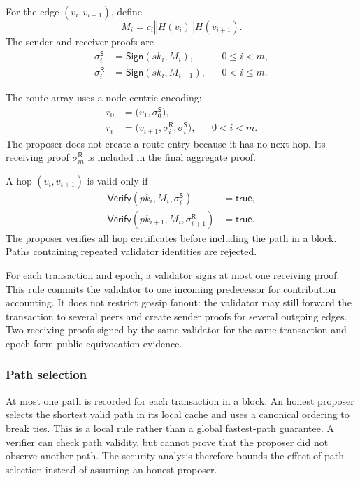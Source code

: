 \documentclass[lettersize,journal]{IEEEtran}
\begin{document}
For the edge $(v_i,v_{i+1})$, define
\begin{equation}
\label{eq:edge_statement}
M_i =
c_i\mathbin\Vert H(v_i)\mathbin\Vert H(v_{i+1}).
\end{equation}
The sender and receiver proofs are
\begin{equation}
\label{eq:path_proofs}
\begin{aligned}
\sigma_i^{\mathsf{S}}
&=
\mathsf{Sign}(sk_i,M_i),
&& 0\leq i<m,\\
\sigma_i^{\mathsf{R}}
&=
\mathsf{Sign}(sk_i,M_{i-1}),
&& 0<i\leq m.
\end{aligned}
\end{equation}

The route array uses a node-centric encoding:
\begin{equation}
\label{eq:route_entries}
\begin{aligned}
r_0
&=
\bigl(v_1,\sigma_0^{\mathsf{S}}\bigr),\\
r_i
&=
\bigl(v_{i+1},\sigma_i^{\mathsf{R}},
      \sigma_i^{\mathsf{S}}\bigr),
&& 0<i<m.
\end{aligned}
\end{equation}
The proposer does not create a route entry because it has no next hop.
Its receiving proof $\sigma_m^{\mathsf{R}}$ is included in the final aggregate proof.

A hop $(v_i,v_{i+1})$ is valid only if
\begin{align}
\mathsf{Verify}\!\left(
pk_i,M_i,\sigma_i^{\mathsf{S}}
\right)
&=\mathsf{true}, \\
\mathsf{Verify}\!\left(
pk_{i+1},M_i,\sigma_{i+1}^{\mathsf{R}}
\right)
&=\mathsf{true}.
\end{align}
The proposer verifies all hop certificates before including the path in a block.
Paths containing repeated validator identities are rejected.

For each transaction and epoch, a validator signs at most one receiving proof.
This rule commits the validator to one incoming predecessor for contribution accounting.
It does not restrict gossip fanout: the validator may still forward the transaction to several peers and create sender proofs for several outgoing edges.
Two receiving proofs signed by the same validator for the same transaction and epoch form public equivocation evidence.

\subsubsection{Path selection}
At most one path is recorded for each transaction in a block.
An honest proposer selects the shortest valid path in its local cache and uses a canonical ordering to break ties.
This is a local rule rather than a global fastest-path guarantee.
A verifier can check path validity, but cannot prove that the proposer did not observe another path.
The security analysis therefore bounds the effect of path selection instead of assuming an honest proposer.
\end{document}
